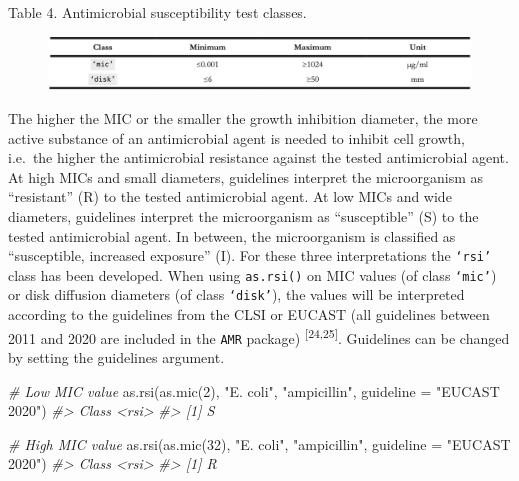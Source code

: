 \documentclass[
]{book}
\newenvironment{Shaded}{\begin{snugshade}}{\end{snugshade}}
\newcommand{\AttributeTok}[1]{\textcolor[rgb]{0.77,0.63,0.00}{#1}}
\newcommand{\CommentTok}[1]{\textcolor[rgb]{0.56,0.35,0.01}{\textit{#1}}}
\newcommand{\DecValTok}[1]{\textcolor[rgb]{0.00,0.00,0.81}{#1}}
\newcommand{\FunctionTok}[1]{\textcolor[rgb]{0.00,0.00,0.00}{#1}}
\newcommand{\NormalTok}[1]{#1}
\newcommand{\StringTok}[1]{\textcolor[rgb]{0.31,0.60,0.02}{#1}}
\begin{document}
Table 4. Antimicrobial susceptibility test classes.

\begin{figure}

{\centering \includegraphics[width=1\linewidth]{images/04-t04} 

}

\end{figure}

The higher the MIC or the smaller the growth inhibition diameter, the more active substance of an antimicrobial agent is needed to inhibit cell growth, i.e.~the higher the antimicrobial resistance against the tested antimicrobial agent. At high MICs and small diameters, guidelines interpret the microorganism as ``resistant'' (R) to the tested antimicrobial agent. At low MICs and wide diameters, guidelines interpret the microorganism as ``susceptible'' (S) to the tested antimicrobial agent. In between, the microorganism is classified as ``susceptible, increased exposure'' (I). For these three interpretations the \texttt{‘rsi’} class has been developed. When using \texttt{as.rsi()} on MIC values (of class \texttt{‘mic’}) or disk diffusion diameters (of class \texttt{‘disk’}), the values will be interpreted according to the guidelines from the CLSI or EUCAST (all guidelines between 2011 and 2020 are included in the \texttt{AMR} package) \textsuperscript{{[}24,25{]}}. Guidelines can be changed by setting the guidelines argument.

\begin{Shaded}
\begin{Highlighting}[]
\CommentTok{\# Low MIC value}
\FunctionTok{as.rsi}\NormalTok{(}\FunctionTok{as.mic}\NormalTok{(}\DecValTok{2}\NormalTok{), }\StringTok{"E. coli"}\NormalTok{, }\StringTok{"ampicillin"}\NormalTok{, }\AttributeTok{guideline =} \StringTok{"EUCAST 2020"}\NormalTok{)}
\CommentTok{\#\textgreater{} Class \textless{}rsi\textgreater{}}
\CommentTok{\#\textgreater{} [1] S}

\CommentTok{\# High MIC value}
\FunctionTok{as.rsi}\NormalTok{(}\FunctionTok{as.mic}\NormalTok{(}\DecValTok{32}\NormalTok{), }\StringTok{"E. coli"}\NormalTok{, }\StringTok{"ampicillin"}\NormalTok{, }\AttributeTok{guideline =} \StringTok{"EUCAST 2020"}\NormalTok{)}
\CommentTok{\#\textgreater{} Class \textless{}rsi\textgreater{}}
\CommentTok{\#\textgreater{} [1] R}
\end{Highlighting}
\end{Shaded}
\end{document}
